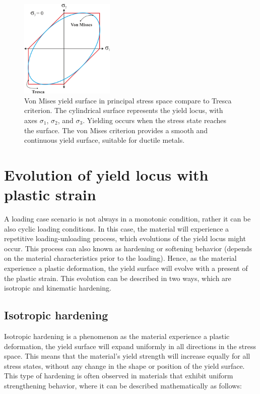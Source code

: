 \documentclass[12pt]{article}
\begin{document}
\begin{figure}[H]
    \centering
    \includegraphics[width=0.4\textwidth]{images/VonMises.png}
    \caption{Von Mises yield surface in principal stress space compare to Tresca criterion. 
    The cylindrical surface represents the yield locus, with axes $\sigma_1$, $\sigma_2$, and $\sigma_3$. 
    Yielding occurs when the stress state reaches the surface. 
    The von Mises criterion provides a smooth and continuous yield surface, suitable for ductile metals.\cite{hosford2005}}
    \label{fig:vonmises_surface}
\end{figure}


\section{Evolution of yield locus with plastic strain}

\hspace{2em}A loading case scenario is not always in a monotonic condition, 
rather it can be also cyclic loading conditions. In this case,
the material will experience a repetitive loading-unloading process, which evolutions of the yield locus might occur. This process can also 
known as hardening or softening behavior (depends on the material characteristics prior to the loading). Hence, as the material
experience a plastic deformation, the yield surface will evolve with a present of the plastic strain. This 
evolution can be described in two ways, which are isotropic and kinematic hardening. 


\subsection{Isotropic hardening}

\hspace{2em}Isotropic hardening is a phenomenon as the material experience a plastic deformation,
the yield surface will expand uniformly in all directions in the stress space. This means that the material's
yield strength will increase equally for all stress states, without any change in the shape or position
of the yield surface. This type of hardening is often observed in materials that exhibit uniform
strengthening behavior, where it can be described mathematically as follows:
\end{document}
